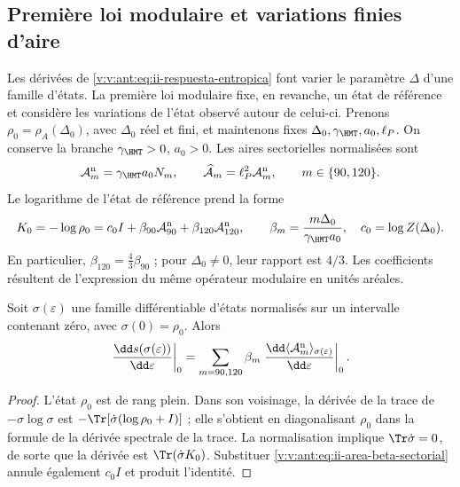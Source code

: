 \subsection{Première loi modulaire et variations finies d'aire}
\label{v:v:ant:sec:ii-area-ley-modular}

Les dérivées de \eqref{v:v:ant:eq:ii-respuesta-entropica} font varier le paramètre
\(\Delta\) d'une famille d'états. La première loi modulaire fixe,
en revanche, un état de référence et considère les variations de l'état
observé autour de celui-ci. Prenons
\(\rho_0=\rho_A(\Delta_0)\), avec \(\Delta_0\) réel et fini,
et maintenons fixes \(\Delta_0,\gamma_{\HMT},a_0,\ell_P\).
On conserve la branche \(\gamma_{\HMT}>0\), \(a_0>0\).
Les aires sectorielles normalisées sont
\begin{equation}
 \mathcal A_m^{\rm n}=\gamma_{\HMT}a_0N_m,
 \qquad
 \widehat{\mathcal A}_m=\ell_P^2\mathcal A_m^{\rm n},
 \qquad m\in\{90,120\}.
 \label{v:v:ant:eq:ii-area-sector-normalizado}
\end{equation}
Le logarithme de l'état de référence prend la forme
\begin{equation}
 K_0=-\log\rho_0
 =c_0I+\beta_{90}\mathcal A_{90}^{\rm n}
         +\beta_{120}\mathcal A_{120}^{\rm n},
 \qquad
 \beta_m=\frac{m\Delta_0}{\gamma_{\HMT}a_0},
 \quad c_0=\log Z(\Delta_0).
 \label{v:v:ant:eq:ii-area-beta-sectorial}
\end{equation}
En particulier, \(\beta_{120}=\tfrac43\beta_{90}\) ; pour
\(\Delta_0\ne0\), leur rapport est \(4/3\). Les coefficients
résultent de l'expression du même opérateur modulaire en unités aréales.

\begin{theorem}
\label{v:v:ant:thm:ii-area-primera-ley}
Soit \(\sigma(\varepsilon)\) une famille différentiable d'états
normalisés sur un intervalle contenant zéro, avec
\(\sigma(0)=\rho_0\). Alors
\begin{equation}
 \left.\frac{\dd s(\sigma(\varepsilon))}{\dd\varepsilon}\right|_0
 =\sum_{m=90,120}\beta_m
   \left.\frac{\dd\langle\mathcal A_m^{\rm n}\rangle_
                       {\sigma(\varepsilon)}}{\dd\varepsilon}\right|_0.
 \label{v:v:ant:eq:ii-area-primera-ley}
\end{equation}
\end{theorem}
\begin{proof}
L'état \(\rho_0\) est de rang plein. Dans son voisinage, la dérivée
de la trace de \(-\sigma\log\sigma\) est
\(-\Tr[\dot\sigma(\log\rho_0+I)]\) ; elle s'obtient en diagonalisant
\(\rho_0\) dans la formule de la dérivée spectrale de la trace.
La normalisation implique \(\Tr\dot\sigma=0\), de sorte que la
dérivée est \(\Tr(\dot\sigma K_0)\). Substituer
\eqref{v:v:ant:eq:ii-area-beta-sectorial} annule également \(c_0I\) et
produit l'identité.
\end{proof}

